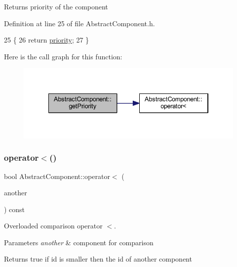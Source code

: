 \begin{DoxyReturn}{Returns}
priority of the component 
\end{DoxyReturn}


Definition at line 25 of file Abstract\+Component.\+h.


\begin{DoxyCode}
25                       \{
26         \textcolor{keywordflow}{return} \hyperlink{class_abstract_component_aff57dfa5f31be093a06b55560e33fb95}{priority};
27     \}
\end{DoxyCode}
Here is the call graph for this function\+:
\nopagebreak
\begin{figure}[H]
\begin{center}
\leavevmode
\includegraphics[width=334pt]{class_abstract_component_ac0b440d1d642ff1292ec3c544d75a8f1_cgraph}
\end{center}
\end{figure}
\mbox{\label{class_abstract_component_a0c2e458144111c5f599c66f168516abc}} 
\subsubsection{\texorpdfstring{operator$<$()}{operator<()}}
{\footnotesize\ttfamily bool Abstract\+Component\+::operator$<$ (\begin{DoxyParamCaption}\item[{const \hyperlink{class_abstract_component}{Abstract\+Component} \&}]{another }\end{DoxyParamCaption}) const}



Overloaded comparison operator \textquotesingle{}$<$\textquotesingle{}. 


\begin{DoxyParams}{Parameters}
{\em another} & component for comparison \\
\hline
\end{DoxyParams}
\begin{DoxyReturn}{Returns}
true if id is smaller then the id of another component 
\end{DoxyReturn}


